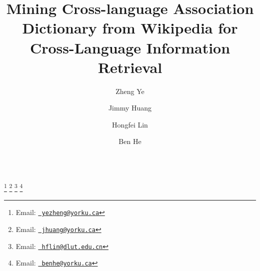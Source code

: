 \documentclass{endm}
\begin{document}
\begin{CJK}{UTF8}{song}
\begin{verbatim}\end{verbatim}\vspace{2.5cm}


\begin{frontmatter}
\title{Mining Cross-language Association Dictionary from Wikipedia for Cross-Language Information Retrieval}


\author{Zheng Ye }
\address{School of Information Technology\\ York University\\ Toronto, Ontario, M3J 1P3, Canada}


\author{Jimmy Huang }
\address{School of Information Technology\\ York University\\
   Toronto, Ontario, M3J 1P3, Canada} 

\author{Hongfei Lin }
\address{Department of Computer Science and Engineering\\ Dalian University of Technology\\ Dalian, Liaoning, 116023, China}

\author{Ben He}
\address{School of Information Technology\\ York University\\
   Toronto, Ontario, M3J 1P3, Canada} 
\thanks[myemail]{Email:
   \href{mailto:yezheng@yorku.ca} {\texttt{\normalshape
   yezheng@yorku.ca}}} 
\thanks[coemail]{Email:
   \href{mailto:jhuang@yorku.ca} {\texttt{\normalshape
   jhuang@yorku.ca}}}
\thanks[coemail1]{Email:
   \href{mailto:hflin@dlut.edu.cn} {\texttt{\normalshape
   hflin@dlut.edu.cn}}}
\thanks[coemail2]{Email:
   \href{mailto:benhe@yorku.ca} {\texttt{\normalshape
   benhe@yorku.ca}}}



\end{frontmatter}
\end{CJK}
\end{document}

